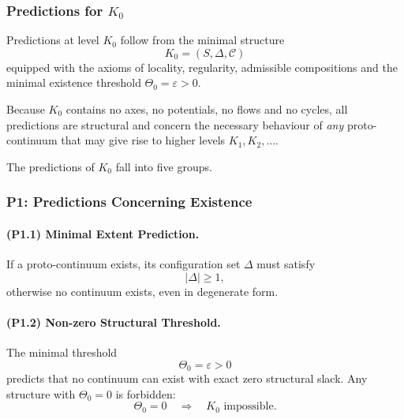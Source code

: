 

\subsubsection{Predictions for \texorpdfstring{$K_0$}{K_0}}
\label{sec:predictions-k0}

Predictions at level $K_0$ follow from the minimal structure  
\[
K_0 = (S, \Delta, \mathcal{C})
\]
equipped with the axioms of locality, regularity, admissible compositions  
and the minimal existence threshold $\Theta_0 = \varepsilon > 0$.

Because $K_0$ contains no axes, no potentials, no flows and no cycles,  
all predictions are structural and concern the necessary behaviour of  
\emph{any} proto-continuum that may give rise to higher levels $K_1, K_2,\dots$.

The predictions of $K_0$ fall into five groups.

\subsubsection{P1: Predictions Concerning Existence}

\paragraph{(P1.1) Minimal Extent Prediction.}
If a proto-continuum exists, its configuration set $\Delta$ must satisfy
\[
|\Delta| \ge 1,
\]
otherwise no continuum exists, even in degenerate form.

\paragraph{(P1.2) Non-zero Structural Threshold.}
The minimal threshold
\[
\Theta_0 = \varepsilon > 0
\]
predicts that no continuum can exist with exact zero structural slack.  
Any structure with $\Theta_0 = 0$ is forbidden:
\[
\Theta_0 = 0 \quad\Rightarrow\quad K_0 \text{ impossible}.
\]

